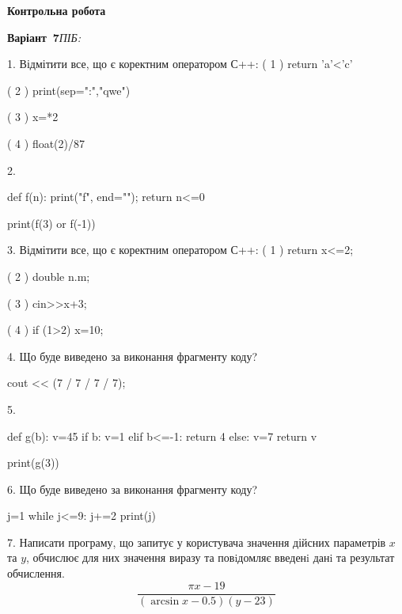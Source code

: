 \documentclass[11pt]{article}
\begin{document}
{\large\textbf{Контрольна робота}}

\textbf{Варіант \No\,7}\hfill \textit{ПІБ:}\,\underline{\hspace{60mm}}
\vspace{4mm}

1. %
Відмітити все, що є коректним оператором С++:
( 1 ) return 'a'<'c'

( 2 ) print(sep=":","qwe")

( 3 ) x=*2

( 4 ) float(2)/87
\vspace{5mm}

2. 

def f(n):
    print("f", end="");
    return n<=0

print(f(3) or f(-1))
\vspace{5mm}

3. %
Відмітити все, що є коректним оператором С++:
( 1 ) return x<=2;

( 2 ) double n.m;

( 3 ) cin>>x+3;

( 4 ) if (1>2) x=10;
\vspace{5mm}

4. Що буде виведено за виконання фрагменту коду?

cout << (7 / 7 / 7 / 7);
\vspace{5mm}

5. 

def g(b):
    v=45
    if b: 
        v=1
    elif b<=-1:
         return 4
    else:
         v=7
    return v

print(g(3))
\vspace{5mm}

6. Що буде виведено за виконання фрагменту коду?

j=1
while j<=9:
    j+=2
print(j)

\vspace{5mm}

7. 
Написати програму, що запитує у користувача значення дійсних параметрів $x$ та $y$, обчислює для них значення виразу та повiдомляє введенi данi та результат обчислення.
$$\frac{\pi x - 19}{(\arcsin x - 0.5) (y - 23)}$$ 

\vspace{5mm}
\end{document}
